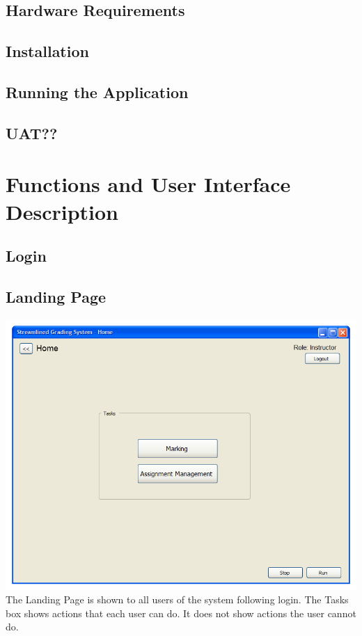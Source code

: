 \documentclass{article}
\begin{document}
\subsection{Hardware Requirements}

\subsection{Installation}

\subsection{Running the Application}

\subsection{UAT??}

\section{Functions and User Interface Description}  %
\subsection{Login}

\subsection{Landing Page}
\includegraphics[scale=0.6]{../images/UIMockups/PNG_Renders/LandingPage}
The Landing Page is shown to all users of the system following login.  The Tasks box shows actions that each user can do.  It does not show actions the user cannot do.
  
\end{document}
